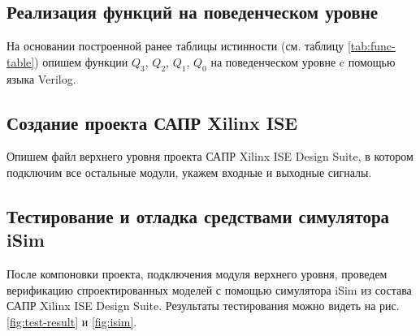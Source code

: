\documentclass[a4paper,14pt]{extarticle}
\begin{document}


\newpage
\subsection{Реализация функций на поведенческом уровне}
На основании построенной ранее таблицы истинности (см. таблицу \ref{tab:func-table}) опишем функции $Q_3$,  $Q_2$, $Q_1$,  $Q_0$ на поведенческом уровне c помощью языка Verilog.


\newpage
\subsection{Создание проекта САПР Xilinx ISE}

Опишем файл верхнего уровня проекта САПР Xilinx ISE Design Suite, в котором подключим все остальные модули, укажем входные и выходные сигналы. 



\subsection{Тестирование и отладка средствами симулятора iSim}
После компоновки проекта, подключения модуля верхнего уровня, проведем верификацию спроектированных моделей с помощью симулятора iSim из состава САПР Xilinx ISE Design Suite. Результаты тестирования можно видеть на рис. \ref{fig:test-result} и \ref{fig:isim}.
\end{document}

